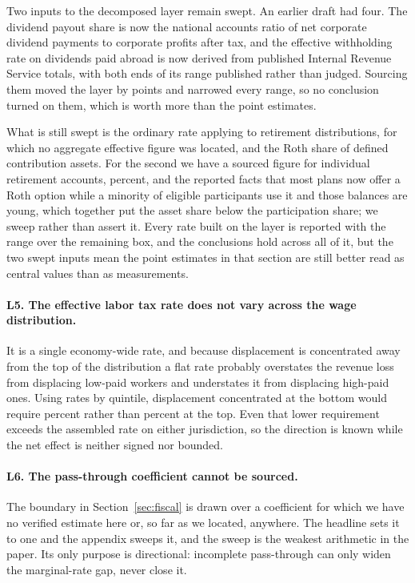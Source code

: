 Two inputs to the decomposed layer remain swept. An earlier draft had four. The dividend payout
share is now the national accounts ratio of net corporate dividend payments to corporate
profits after tax, and the effective withholding rate on dividends paid abroad is now derived
from published Internal Revenue Service totals, with both ends of its range published rather
than judged. Sourcing them moved the layer by  points and narrowed every
range, so no conclusion turned on them, which is worth more than the point estimates.

What is still swept is the ordinary rate applying to retirement distributions, for which no
aggregate effective figure was located, and the Roth share of defined contribution assets. For
the second we have a sourced figure for individual retirement accounts,  percent,
and the reported facts that most plans now offer a Roth option while a minority of eligible
participants use it and those balances are young, which together put the asset share below the
participation share; we sweep rather than assert it. Every rate built on the layer is reported
with the range over the remaining box, and the conclusions hold across all of it, but the two
swept inputs mean the point estimates in that section are still better read as central values
than as measurements.

\paragraph{L5. The effective labor tax rate does not vary across the wage distribution.} It is a
single economy-wide rate, and because displacement is concentrated away from the top of the
distribution a flat rate probably overstates the revenue loss from displacing low-paid workers
and understates it from displacing high-paid ones. Using rates by quintile, displacement
concentrated at the bottom would require  percent rather than
 percent at the top. Even that lower requirement exceeds the
assembled rate on either jurisdiction, so the direction is known while the net effect is neither
signed nor bounded.

\paragraph{L6. The pass-through coefficient cannot be sourced.} The boundary in
Section~\ref{sec:fiscal} is drawn over a coefficient for which we have no verified estimate here
or, so far as we located, anywhere. The headline sets it to one and the appendix sweeps it, and
the sweep is the weakest arithmetic in the paper. Its only purpose is directional: incomplete
pass-through can only widen the marginal-rate gap, never close it.

